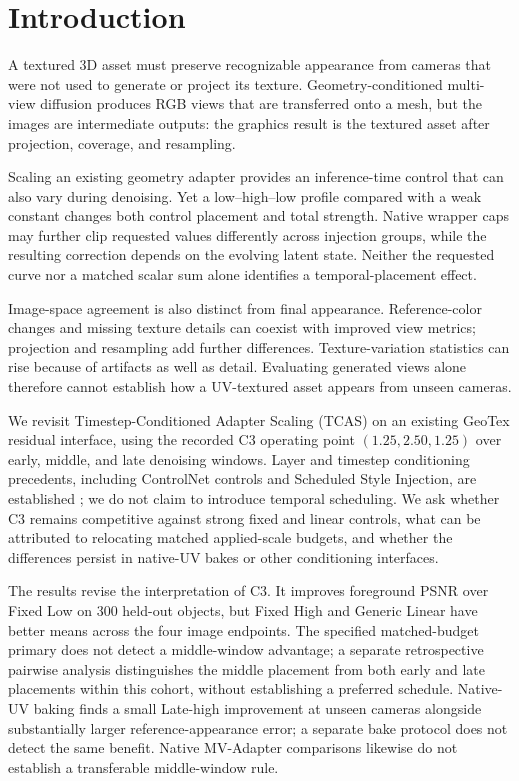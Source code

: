 \documentclass[times,twocolumn,final]{elsarticle}
\begin{document}
\raggedbottom
\linenumbers

\section{Introduction}
\label{sec:intro}

A textured 3D asset must preserve recognizable appearance from cameras that were not used to generate or project its texture. Geometry-conditioned multi-view diffusion produces RGB views that are transferred onto a mesh, but the images are intermediate outputs: the graphics result is the textured asset after projection, coverage, and resampling.

Scaling an existing geometry adapter provides an inference-time control that can also vary during denoising. Yet a low--high--low profile compared with a weak constant changes both control placement and total strength. Native wrapper caps may further clip requested values differently across injection groups, while the resulting correction depends on the evolving latent state. Neither the requested curve nor a matched scalar sum alone identifies a temporal-placement effect.

Image-space agreement is also distinct from final appearance. Reference-color changes and missing texture details can coexist with improved view metrics; projection and resampling add further differences. Texture-variation statistics can rise because of artifacts as well as detail. Evaluating generated views alone therefore cannot establish how a UV-textured asset appears from unseen cameras.

We revisit Timestep-Conditioned Adapter Scaling (TCAS) on an existing GeoTex residual interface, using the recorded C3 operating point $(1.25,2.50,1.25)$ over early, middle, and late denoising windows. Layer and timestep conditioning precedents, including ControlNet controls and Scheduled Style Injection, are established \cite{controlnet2023layercontrol,diffusers2023controlnet,kulkarni2026ssi}; we do not claim to introduce temporal scheduling. We ask whether C3 remains competitive against strong fixed and linear controls, what can be attributed to relocating matched applied-scale budgets, and whether the differences persist in native-UV bakes or other conditioning interfaces.

The results revise the interpretation of C3. It improves foreground PSNR over Fixed Low on 300 held-out objects, but Fixed High and Generic Linear have better means across the four image endpoints. The specified matched-budget primary does not detect a middle-window advantage; a separate retrospective pairwise analysis distinguishes the middle placement from both early and late placements within this cohort, without establishing a preferred schedule. Native-UV baking finds a small Late-high improvement at unseen cameras alongside substantially larger reference-appearance error; a separate bake protocol does not detect the same benefit. Native MV-Adapter comparisons likewise do not establish a transferable middle-window rule.
\end{document}

